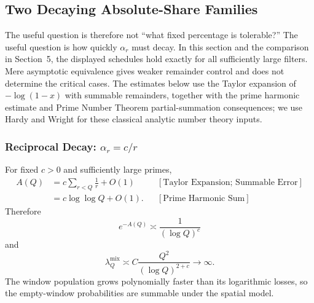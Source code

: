 \subsection{Two Decaying Absolute-Share Families}
The useful question is therefore not “what fixed percentage is tolerable?” The useful question is how quickly $\alpha_r$ must decay. In this section and the comparison in Section~5, the displayed schedules hold exactly for all sufficiently large filters. Mere asymptotic equivalence gives weaker remainder control and does not determine the critical cases.
The estimates below use the Taylor expansion of $-\log(1-x)$ with
summable remainders, together with the prime harmonic estimate and Prime
Number Theorem partial-summation consequences; we use Hardy and Wright
\cite{hardywright2008} for these classical analytic number theory inputs.
\subsubsection*{Reciprocal Decay: $\alpha_r= c/r$}
For fixed $c > 0$ and sufficiently large primes,
\begin{equation*}
\begin{aligned}
A(Q)
&=c\sum_{r < Q}\frac1r+O(1)
&&[\text{Taylor Expansion; Summable Error}]\\
&=c\log\log Q+O(1).
&&[\text{Prime Harmonic Sum}]
\end{aligned}
\end{equation*}
Therefore
\begin{equation*}
e^{-A(Q)}\asymp\frac1{(\log Q)^c}
\end{equation*}
and
\begin{equation*}
\lambda_Q^{\mathrm{mix}}
\asymp
C\frac{Q^2}{(\log Q)^{2+c}}\longrightarrow\infty.
\end{equation*}
The window population grows polynomially faster than its logarithmic losses, so the empty-window probabilities are summable under the spatial model.
